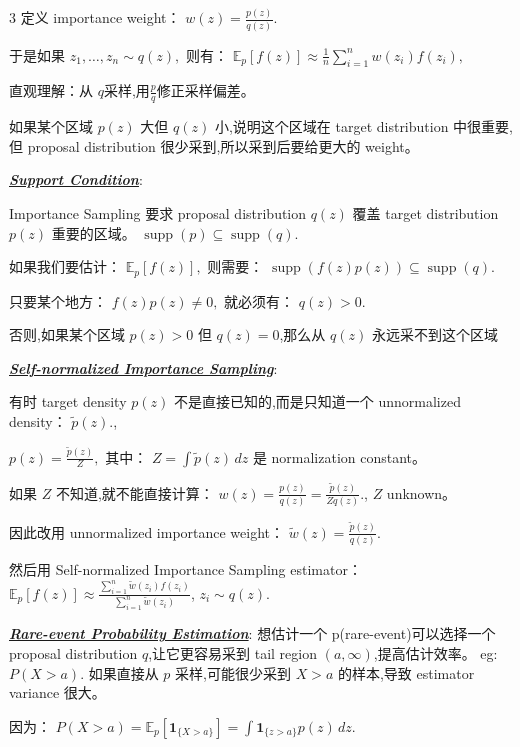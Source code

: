 \documentclass[12pt]{article}
\newcommand{\bulletPoint}[1]{\underline{\textit{\textbf{#1}}}}
\begin{document}
\begin{multicols*}{3}
定义 importance weight：
$
w(z)=\frac{p(z)}{q(z)}.
$

于是如果
$
z_1,\dots,z_n\sim q(z),
$
则有：
$
\mathbb E_p[f(z)]
\approx
\frac{1}{n}
\sum_{i=1}^n
w(z_i)f(z_i),
$


直观理解：从 $q$采样,用$\frac{p}{q}$修正采样偏差。


如果某个区域 $p(z)$ 大但 $q(z)$ 小,说明这个区域在 target distribution 中很重要,但 proposal distribution 很少采到,所以采到后要给更大的 weight。


\bulletPoint{Support Condition}:

Importance Sampling 要求 proposal distribution $q(z)$ 覆盖 target distribution $p(z)$ 重要的区域。
$
\operatorname{supp}(p)
\subseteq
\operatorname{supp}(q).
$

如果我们要估计：
$
\mathbb E_p[f(z)],
$
则需要：
$
\operatorname{supp}(f(z)p(z))
\subseteq
\operatorname{supp}(q).
$

只要某个地方：
$
f(z)p(z)\neq 0,
$
就必须有：
$
q(z)>0.
$

否则,如果某个区域 $p(z)>0$ 但 $q(z)=0$,那么从 $q(z)$ 永远采不到这个区域


\bulletPoint{Self-normalized Importance Sampling}:

有时 target density $p(z)$ 不是直接已知的,而是只知道一个 unnormalized density：
$
\tilde p(z).
$,

$
p(z)=\frac{\tilde p(z)}{Z},
$
其中：
$
Z=\int \tilde p(z)\,dz
$
是 normalization constant。

如果 $Z$ 不知道,就不能直接计算：
$
w(z)
=
\frac{p(z)}{q(z)}
=
\frac{\tilde p(z)}{Zq(z)}.
$, $Z$ unknown。

因此改用 unnormalized importance weight：
$
\tilde w(z)=\frac{\tilde p(z)}{q(z)}.
$

然后用 Self-normalized Importance Sampling estimator：
$
\mathbb E_p[f(z)]
\approx
\frac{
\sum_{i=1}^n \tilde w(z_i)f(z_i)
}{
\sum_{i=1}^n \tilde w(z_i)
}$, 
$
z_i\sim q(z).
$



\bulletPoint{Rare-event Probability Estimation}:
想估计一个 p(rare-event)可以选择一个 proposal distribution $q$,让它更容易采到 tail region $(a,\infty)$,提高估计效率。
 eg:$P(X>a).$
如果直接从 $p$ 采样,可能很少采到 $X>a$ 的样本,导致 estimator variance 很大。

因为：
$
P(X>a)
=
\mathbb E_p\left[
\mathbf 1_{\{X>a\}}
\right]
=
\int \mathbf 1_{\{z>a\}}p(z)\,dz.
$


\end{multicols*}
\end{document}
